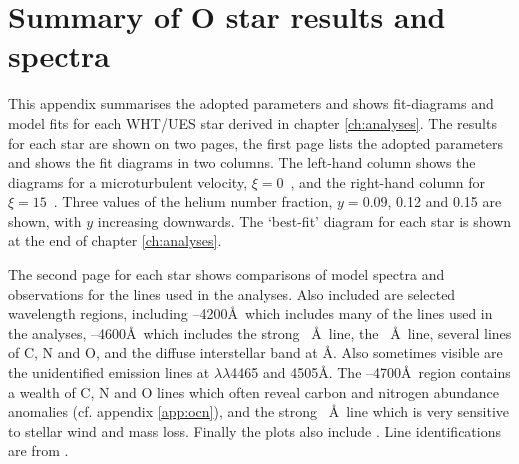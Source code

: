\chapter{Summary of O star results and spectra}
\label{app:osumm}

This appendix summarises the adopted parameters and shows fit-diagrams
and model fits for each WHT/UES star derived in chapter
\ref{ch:analyses}. The results for each star are shown on two pages,
the first page lists the adopted parameters and shows the fit diagrams
in two columns. The left-hand column shows the diagrams for a
microturbulent velocity, $\xi = 0$~\kms, and the right-hand column for
$\xi = 15$~\kms. Three values of the helium number fraction, $y =
0.09$, 0.12 and 0.15 are shown, with $y$ increasing downwards. The
`best-fit' diagram for each star is shown at the end of chapter
\ref{ch:analyses}.

The second page for each star shows comparisons of model spectra and
observations for the lines used in the analyses. Also included
are selected wavelength regions, including \lam{}--4200\AA\
which includes many of the lines used in the analyses,
\lam{}--4600\AA\ which includes the strong \hei\ \AA\
line, the \heii\ \AA\ line, several lines of C, N and O, and
the diffuse interstellar band at \lam4430\AA. Also sometimes visible
are the unidentified emission lines at $\lambda\lambda$4465 and
4505\AA. The \lam\lam4600--4700\AA\ region contains a wealth of C, N
and O lines which often reveal carbon and nitrogen abundance anomalies
(cf. appendix \ref{app:ocn}), and the strong \heii\ \lam4686\AA\ line which is
very sensitive to stellar wind and mass loss. Finally the plots also
include \ha. Line identifications are from
\ybcite{scholtz:lines}.




